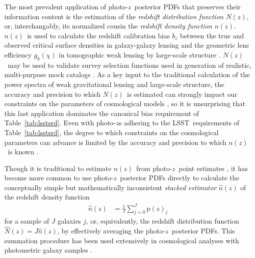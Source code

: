 \documentclass[iop]{emulateapj}
\newcommand{\todo}[3]{{\color{#2}\emph{#1}: #3}}
\newcommand{\aim}[1]{\todo{AIM}{red}{#1}}
\newcommand{\Tab}[1]{Table~\ref{#1}}
\newcommand{\project}[1]{\textsc{#1}}
\newcommand{\lsst}{\project{LSST}}
\newcommand{\pr}[1]{\ensuremath{\mathrm{p}(#1)}}%
\newcommand{\pz}{photo-$z$}
\newcommand{\pzpdf}{\pz\ posterior PDF}%
\newcommand{\nz}{$n(z)$}
\newcommand{\Nz}{$N(z)$}
\begin{document}
The most prevalent application of \pzpdf s that preserves their information content is the estimation of the \textit{redshift distribution function \Nz}, or, interchangably, its normalized cousin the \textit{redshift density function \nz}.
\nz\ is used to calculate the redshift calibration bias $b_{z}$ between the true and observed critical surface densities in galaxy-galaxy lensing \citep{mandelbaum_precision_2008} and the geometric lens efficiency $g_{k}(\chi)$ in tomographic weak lensing by large-scale structure \citep{benjamin_cfhtlens_2013}.
\Nz\ may be used to validate survey selection functions used in generation of realistic, multi-purpose mock catalogs \citep{norberg_2df_2002}.
As a key input to the traditional calculation of the power spectra of weak gravitational lensing and large-scale structure, the accuracy and precision to which \Nz\ is estimated can strongly impact our constraints on the parameters of cosmological models \citep{bonnett_using_2015,  masters_mapping_2015, viironen_high_2015, asorey_galaxy_2016, bonnett_redshift_2016, yang_calibrating_2018}, so it is unsurprising that this last application dominates the canonical bias requirement of Table~\ref{tab:lsstsrd}.
Even with \pz s adhering to the \lsst\ requirements of \Tab{tab:lsstsrd}, the degree to which constraints on the cosmological parameters can advance is limited by the accuracy and precision to which \nz\ is known \citep{abruzzo_impact_2019}.

Though it is traditional to estimate \nz\ from \pz\ point estimates \citep{abruzzo_impact_2019}, it has become more common to use \pzpdf s directly to calculate the conceptually simple but mathematically inconsistent \citep{hogg_data_2012} \textit{stacked estimator} $\hat{n}(z)$ of the redshift density function \citep{lima_estimating_2008}
\begin{align}
\label{eqn:stack}
\hat{n}(z) &= \frac{1}{J} \sum_{j = 0}^{J} \pr{z}_{j}
\end{align}
for a sample of $J$ galaxies $j$, or, equivalently, the redshift distribution function $\hat{N}(z) = J \hat{n}(z)$, by effectively averaging the \pzpdf s.
This summation procedure has been used extensively in cosmological analyses with photometric galaxy samples \citep{mandelbaum_precision_2008, benjamin_cfhtlens_2013, kelly_weighing_2014}.
\end{document}
